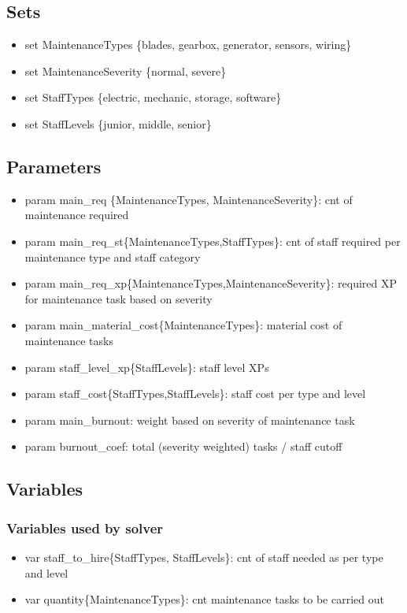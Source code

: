    \subsection{Sets}
      \begin{itemize}
          \item set MaintenanceTypes \{blades, gearbox, generator, sensors, wiring\}
          \item set MaintenanceSeverity \{normal, severe\}
          \item set StaffTypes \{electric, mechanic, storage, software\}
          \item set StaffLevels \{junior, middle, senior\}
        \end{itemize}

      \subsection{Parameters}
        \begin{itemize}
          \item param main\_req \{MaintenanceTypes, MaintenanceSeverity\}: cnt of maintenance required
          \item param main\_req\_st\{MaintenanceTypes,StaffTypes\}: cnt of staff required per maintenance type and staff category
          \item param main\_req\_xp\{MaintenanceTypes,MaintenanceSeverity\}: required XP for maintenance task based on severity
          \item param main\_material\_cost\{MaintenanceTypes\}: material cost of maintenance tasks
          \item param staff\_level\_xp\{StaffLevels\}: staff level XPs
          \item param staff\_cost\{StaffTypes,StaffLevels\}: staff cost per type and level
          \item param main\_burnout: weight based on severity of maintenance task
          \item param burnout\_coef: total (severity weighted) tasks / staff cutoff
        \end{itemize}

      \subsection{Variables}
        \subsubsection{Variables used by solver}
          \begin{itemize}
            \item var staff\_to\_hire\{StaffTypes, StaffLevels\}: cnt of staff needed as per type and level
            \item var quantity\{MaintenanceTypes\}: cnt maintenance tasks to be carried out
          \end{itemize}


